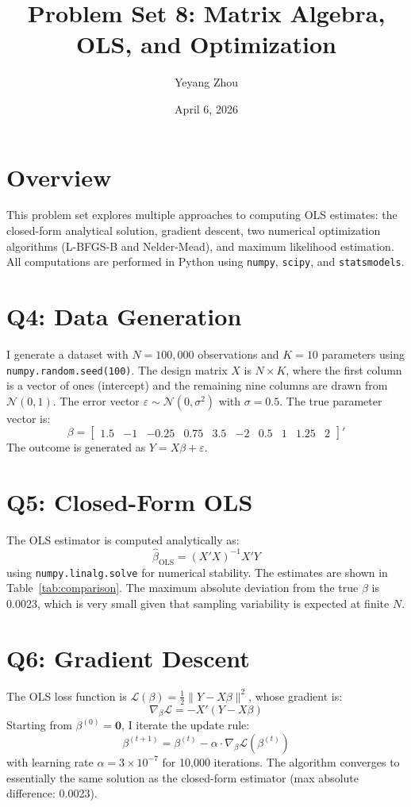\documentclass[12pt]{article}
\title{Problem Set 8: Matrix Algebra, OLS, and Optimization}
\author{Yeyang Zhou}
\date{April 6, 2026}
\begin{document}
\maketitle

\section*{Overview}

This problem set explores multiple approaches to computing OLS estimates: the closed-form analytical solution, gradient descent, two numerical optimization algorithms (L-BFGS-B and Nelder-Mead), and maximum likelihood estimation. All computations are performed in Python using \texttt{numpy}, \texttt{scipy}, and \texttt{statsmodels}.

\section*{Q4: Data Generation}

I generate a dataset with $N = 100{,}000$ observations and $K = 10$ parameters using \texttt{numpy.random.seed(100)}. The design matrix $X$ is $N \times K$, where the first column is a vector of ones (intercept) and the remaining nine columns are drawn from $\mathcal{N}(0,1)$. The error vector $\varepsilon \sim \mathcal{N}(0, \sigma^2)$ with $\sigma = 0.5$. The true parameter vector is:
\[
\beta = \begin{bmatrix} 1.5 & -1 & -0.25 & 0.75 & 3.5 & -2 & 0.5 & 1 & 1.25 & 2 \end{bmatrix}'
\]
The outcome is generated as $Y = X\beta + \varepsilon$.

\section*{Q5: Closed-Form OLS}

The OLS estimator is computed analytically as:
\[
\hat{\beta}_{\text{OLS}} = (X'X)^{-1}X'Y
\]
using \texttt{numpy.linalg.solve} for numerical stability. The estimates are shown in Table~\ref{tab:comparison}. The maximum absolute deviation from the true $\beta$ is 0.0023, which is very small given that sampling variability is expected at finite $N$.

\section*{Q6: Gradient Descent}

The OLS loss function is $\mathcal{L}(\beta) = \frac{1}{2}\|Y - X\beta\|^2$, whose gradient is:
\[
\nabla_\beta \mathcal{L} = -X'(Y - X\beta)
\]
Starting from $\beta^{(0)} = \mathbf{0}$, I iterate the update rule:
\[
\beta^{(t+1)} = \beta^{(t)} - \alpha \cdot \nabla_\beta \mathcal{L}(\beta^{(t)})
\]
with learning rate $\alpha = 3 \times 10^{-7}$ for 10{,}000 iterations. The algorithm converges to essentially the same solution as the closed-form estimator (max absolute difference: 0.0023).
\end{document}
